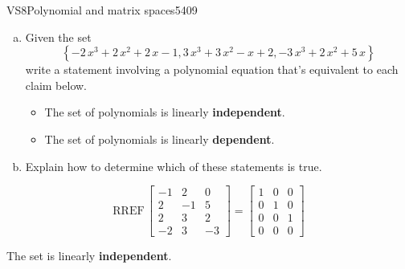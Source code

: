 \begin{exercise}{VS8}{Polynomial and matrix spaces}{5409} 
\begin{exerciseStatement} 

\begin{enumerate}[(a)]
\item  

 Given the set \[\left\{ -2 \, x^{3} + 2 \, x^{2} + 2 \, x - 1 , 3 \, x^{3} + 3 \, x^{2} - x + 2 , -3 \, x^{3} + 2 \, x^{2} + 5 \, x \right\}\] write a statement involving a polynomial equation that's equivalent to each claim below. 

 

\begin{itemize}
\item  

 The set of polynomials is linearly \textbf{independent}. 

 
\item  

 The set of polynomials is linearly \textbf{dependent}. 

 
\end{itemize}

     
\item  

 Explain how to determine which of these statements is true. 

 
\end{enumerate}

     \end{exerciseStatement}
 \begin{exerciseAnswer} 

 \[
\mathrm{RREF}\, \left[\begin{array}{ccc}
-1 & 2 & 0 \\
2 & -1 & 5 \\
2 & 3 & 2 \\
-2 & 3 & -3
\end{array}\right] = \left[\begin{array}{ccc}
1 & 0 & 0 \\
0 & 1 & 0 \\
0 & 0 & 1 \\
0 & 0 & 0
\end{array}\right]
            \] 

 

 The set is linearly \textbf{independent}. 

 \end{exerciseAnswer}
 \end{exercise}


